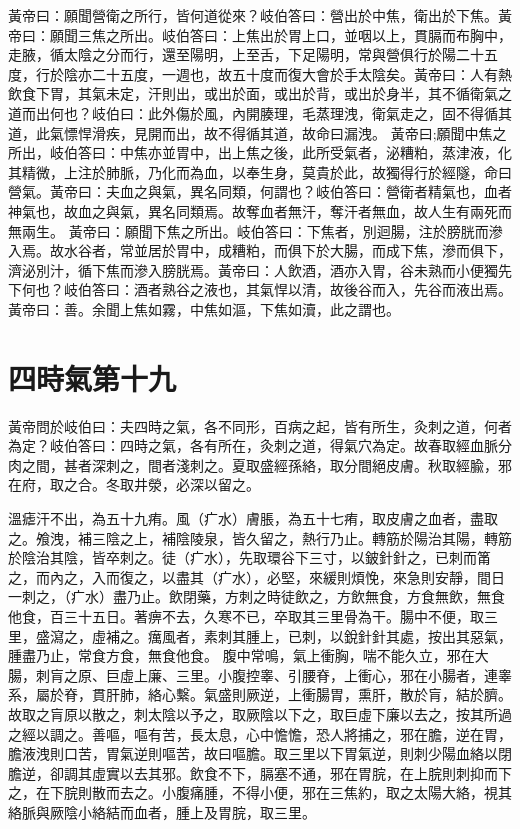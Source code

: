 黃帝曰：願聞營衛之所行，皆何道從來？岐伯答曰：營出於中焦，衛出於下焦。黃帝曰：願聞三焦之所出。岐伯答曰：上焦出於胃上口，並咽以上，貫膈而布胸中，走腋，循太陰之分而行，還至陽明，上至舌，下足陽明，常與營俱行於陽二十五度，行於陰亦二十五度，一週也，故五十度而復大會於手太陰矣。黃帝曰：人有熱飲食下胃，其氣未定，汗則出，或出於面，或出於背，或出於身半，其不循衛氣之道而出何也？岐伯曰：此外傷於風，內開腠理，毛蒸理洩，衛氣走之，固不得循其道，此氣慓悍滑疾，見開而出，故不得循其道，故命曰漏洩。
黃帝曰;願聞中焦之所出，岐伯答曰：中焦亦並胃中，出上焦之後，此所受氣者，泌糟粕，蒸津液，化其精微，上注於肺脈，乃化而為血，以奉生身，莫貴於此，故獨得行於經隧，命曰營氣。黃帝曰：夫血之與氣，異名同類，何謂也？岐伯答曰：營衛者精氣也，血者神氣也，故血之與氣，異名同類焉。故奪血者無汗，奪汗者無血，故人生有兩死而無兩生。
黃帝曰：願聞下焦之所出。岐伯答曰：下焦者，別迴腸，注於膀胱而滲入焉。故水谷者，常並居於胃中，成糟粕，而俱下於大腸，而成下焦，滲而俱下，濟泌別汁，循下焦而滲入膀胱焉。黃帝曰：人飲酒，酒亦入胃，谷未熟而小便獨先下何也？岐伯答曰：酒者熟谷之液也，其氣悍以清，故後谷而入，先谷而液出焉。黃帝曰：善。余聞上焦如霧，中焦如漚，下焦如瀆，此之謂也。

\section{四時氣第十九}

黃帝問於岐伯曰：夫四時之氣，各不同形，百病之起，皆有所生，灸刺之道，何者為定？岐伯答曰：四時之氣，各有所在，灸刺之道，得氣穴為定。故春取經血脈分肉之間，甚者深刺之，間者淺刺之。夏取盛經孫絡，取分間絕皮膚。秋取經腧，邪在府，取之合。冬取井滎，必深以留之。

溫瘧汗不出，為五十九痏。風（疒水）膚脹，為五十七痏，取皮膚之血者，盡取之。飧洩，補三陰之上，補陰陵泉，皆久留之，熱行乃止。轉筋於陽治其陽，轉筋於陰治其陰，皆卒刺之。徒（疒水），先取環谷下三寸，以鈹針針之，已刺而筩之，而內之，入而復之，以盡其（疒水），必堅，來緩則煩悗，來急則安靜，間日一刺之，（疒水）盡乃止。飲閉藥，方刺之時徒飲之，方飲無食，方食無飲，無食他食，百三十五日。著痹不去，久寒不已，卒取其三里骨為干。腸中不便，取三里，盛瀉之，虛補之。癘風者，素刺其腫上，已刺，以銳針針其處，按出其惡氣，腫盡乃止，常食方食，無食他食。
腹中常鳴，氣上衝胸，喘不能久立，邪在大腸，刺肓之原、巨虛上廉、三里。小腹控睾、引腰脊，上衝心，邪在小腸者，連睾系，屬於脊，貫肝肺，絡心繫。氣盛則厥逆，上衝腸胃，熏肝，散於肓，結於臍。故取之肓原以散之，刺太陰以予之，取厥陰以下之，取巨虛下廉以去之，按其所過之經以調之。善嘔，嘔有苦，長太息，心中憺憺，恐人將捕之，邪在膽，逆在胃，膽液洩則口苦，胃氣逆則嘔苦，故曰嘔膽。取三里以下胃氣逆，則刺少陽血絡以閉膽逆，卻調其虛實以去其邪。飲食不下，膈塞不通，邪在胃脘，在上脘則刺抑而下之，在下脘則散而去之。小腹痛腫，不得小便，邪在三焦約，取之太陽大絡，視其絡脈與厥陰小絡結而血者，腫上及胃脘，取三里。

